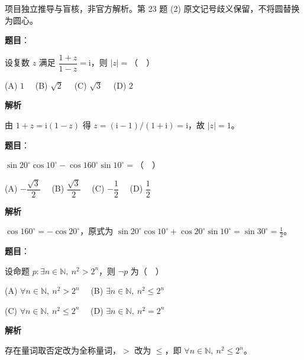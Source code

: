 

\begin{gktip}
项目独立推导与盲核，非官方解析。第 23 题 (2) 原文记号歧义保留，不将圆替换为圆心。
\end{gktip}

\begin{answer}

\textbf{题目}：

设复数 $z$ 满足 $\dfrac{1+z}{1-z}=\mathrm{i}$，则 $|z|=$（　）

(A) $1$　 (B) $\sqrt2$　 (C) $\sqrt3$　 (D) $2$

\textbf{解析}

由 $1+z=\mathrm i(1-z)$ 得 $z=(\mathrm i-1)/(1+\mathrm i)=\mathrm i$，故 $|z|=1$。


\end{answer}
\begin{answer}

\textbf{题目}：

$\sin20^\circ\cos10^\circ-\cos160^\circ\sin10^\circ=$（　）

(A) $-\dfrac{\sqrt3}{2}$　 (B) $\dfrac{\sqrt3}{2}$　 (C) $-\dfrac12$　 (D) $\dfrac12$

\textbf{解析}

$\cos160^\circ=-\cos20^\circ$，原式为 $\sin20^\circ\cos10^\circ+\cos20^\circ\sin10^\circ=\sin30^\circ=\tfrac12$。


\end{answer}
\begin{answer}

\textbf{题目}：

设命题 $p:\exists n\in\mathbb N,\ n^2>2^n$，则 $\neg p$ 为（　）

(A) $\forall n\in\mathbb N,\ n^2>2^n$　 (B) $\exists n\in\mathbb N,\ n^2\leqslant2^n$

(C) $\forall n\in\mathbb N,\ n^2\leqslant2^n$　 (D) $\exists n\in\mathbb N,\ n^2=2^n$

\textbf{解析}

存在量词取否定改为全称量词，$>$ 改为 $\leqslant$，即 $\forall n\in\mathbb N,\ n^2\leqslant2^n$。


\end{answer}
